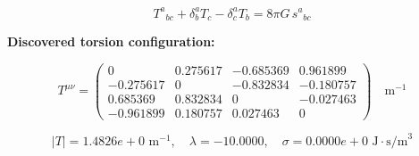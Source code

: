 
\begin{equation}
  T^a{}_{bc} + \delta^a_b T_c - \delta^a_c T_b = 8\pi G \, s^a{}_{bc}
\end{equation}

\textbf{Discovered torsion configuration:}

\begin{equation}
  T^{\mu\nu} = \begin{pmatrix}
    0 & 0.275617 & -0.685369 & 0.961899 \\
    -0.275617 & 0 & -0.832834 & -0.180757 \\
    0.685369 & 0.832834 & 0 & -0.027463 \\
    -0.961899 & 0.180757 & 0.027463 & 0
  \end{pmatrix} \quad \text{m}^{-1}
\end{equation}

\begin{equation}
  |T| = 1.4826e+0 \text{ m}^{-1}, \quad
  \lambda = -10.0000, \quad
  \sigma = 0.0000e+0 \text{ J}\cdot\text{s/m}^3
\end{equation}